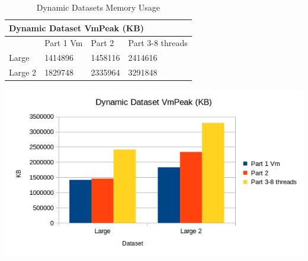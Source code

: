 \documentclass[11pt]{article}
\begin{document}
\begin{enumerate}
\begin{table}[H]
\caption{Dynamic Datasets Memory Usage}
\begin{minipage}{.5\textwidth}
\centering
\footnotesize
\tabcolsep=0.11cm
\label{ddm}
\begin{tabular}{|l|l|l|l|}
\hline
\multicolumn{4}{|l|}{Dynamic Dataset VmPeak (KB)} \\ \hline
         & Part 1 Vm & Part 2  & Part 3-8 threads \\ \hline
Large    & 1414896   & 1458116 & 2414616          \\ \hline
Large 2  & 1829748   & 2335964 & 3291848          \\ \hline
\end{tabular}
\end{minipage}%
\begin{minipage}{.5\textwidth}
\includegraphics[scale=0.5]{DynamicDatasets_VmPeak.png}
\end{minipage}%
\end{table}


\end{enumerate}
\end{document}
